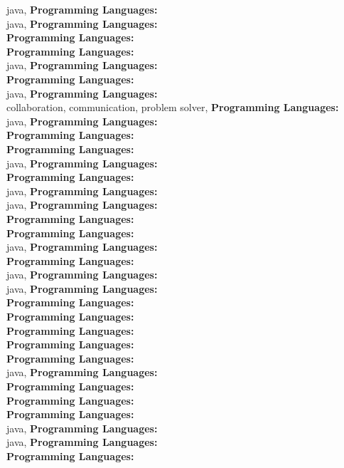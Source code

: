 java, \textbf{Programming Languages:} \\
java, \textbf{Programming Languages:} \\
\textbf{Programming Languages:} \\
\textbf{Programming Languages:} \\
java, \textbf{Programming Languages:} \\
\textbf{Programming Languages:} \\
java, \textbf{Programming Languages:} \\
collaboration, communication, problem solver, \textbf{Programming Languages:} \\
java, \textbf{Programming Languages:} \\
\textbf{Programming Languages:} \\
\textbf{Programming Languages:} \\
java, \textbf{Programming Languages:} \\
\textbf{Programming Languages:} \\
java, \textbf{Programming Languages:} \\
java, \textbf{Programming Languages:} \\
\textbf{Programming Languages:} \\
\textbf{Programming Languages:} \\
java, \textbf{Programming Languages:} \\
\textbf{Programming Languages:} \\
java, \textbf{Programming Languages:} \\
java, \textbf{Programming Languages:} \\
\textbf{Programming Languages:} \\
\textbf{Programming Languages:} \\
\textbf{Programming Languages:} \\
\textbf{Programming Languages:} \\
\textbf{Programming Languages:} \\
java, \textbf{Programming Languages:} \\
\textbf{Programming Languages:} \\
\textbf{Programming Languages:} \\
\textbf{Programming Languages:} \\
java, \textbf{Programming Languages:} \\
java, \textbf{Programming Languages:} \\
\textbf{Programming Languages:} \\
